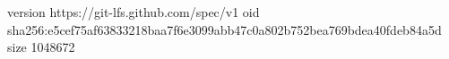 version https://git-lfs.github.com/spec/v1
oid sha256:e5cef75af63833218baa7f6e3099abb47c0a802b752bea769bdea40fdeb84a5d
size 1048672
